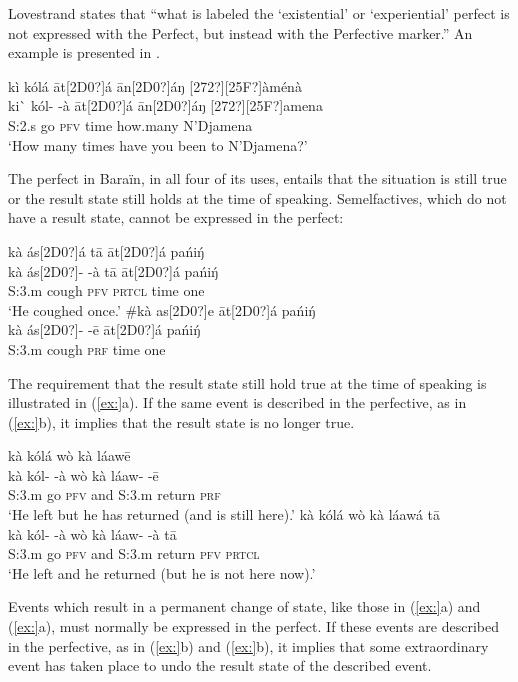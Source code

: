 Lovestrand states that “what is labeled the ‘existential’ or ‘experiential’ perfect is not expressed with the Perfect, but instead with the Perfective marker.” An example is presented in .


\ea
\glll kì  kólá    āt[2D0?]á  ān[2D0?]áŋ  [272?][25F?]àménà\\
ki\`{}   kól-  -à  āt[2D0?]á  ān[2D0?]áŋ  [272?][25F?]amena\\
S:2.s  go  \textsc{pfv}  time  how.many  N’Djamena\\
\glt ‘How many times have you been to N’Djamena?’
\z


The perfect in Baraïn, in all four of its uses, entails that the situation is still true or the result state still holds at the time of speaking. Semelfactives, which do not have a result state, cannot be expressed in the perfect:


\ea
\ea \glll  kà  ás[2D0?]á    tā  āt[2D0?]á  pańi\'{ŋ}\\
kà  ás[2D0?]-  -à  tā  āt[2D0?]á  pańi\'{ŋ}\\
S:3.m  cough  \textsc{pfv}  \textsc{prtcl}  time  one\\
\glt ‘He coughed once.’
\ex \glll  \#kà  as[2D0?]e    āt[2D0?]á  pańi\'{ŋ}\\
  kà  ás[2D0?]-  -ē  āt[2D0?]á  pańi\'{ŋ}\\
S:3.m  cough  \textsc{prf}  time  one\\
\z \z


The requirement that the result state still hold true at the time of speaking is illustrated in (\ref{ex:}a). If the same event is described in the perfective, as in (\ref{ex:}b), it implies that the result state is no longer true.


\ea
\ea  \glll kà  kólá    wò  kà  láawē\\
kà  kól-  -à  wò  kà  láaw-  -ē\\
S:3.m  go  \textsc{pfv}  and  S:3.m  return  \textsc{prf}\\
\glt ‘He left but he has returned (and is still here).’
\ex \glll   kà  kólá    wò  kà  láawá    tā\\
kà  kól-  -à  wò  kà  láaw-  -à  tā\\
S:3.m  go  \textsc{pfv}  and  S:3.m  return  \textsc{pfv}  \textsc{prtcl}\\
\glt ‘He left and he returned (but he is not here now).’
\z \z


Events which result in a permanent change of state, like those in (\ref{ex:}a) and (\ref{ex:}a), must normally be expressed in the perfect. If these events are described in the perfective, as in (\ref{ex:}b) and (\ref{ex:}b), it implies that some extraordinary event has taken place to undo the result state of the described event.


